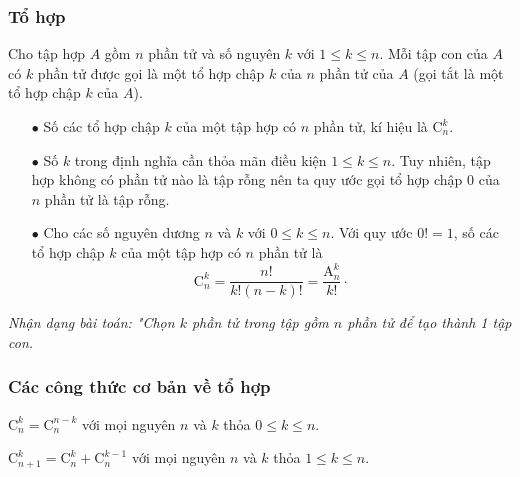 \subsubsection{Tổ hợp}
Cho tập hợp $A$ gồm $n$ phần tử và số nguyên $k$ với $1\le k\le n$. Mỗi tập con của $A$ có $k$ phần tử được gọi là một tổ hợp chập $k$ của $n$ phần tử của $A$ (gọi tắt là một tổ hợp chập $k$ của $A$).
\begin{boxkn}
	\begin{itemize}
		\item [$\bullet$] Số các tổ hợp chập $k$ của một tập hợp có $n$ phần tử, kí hiệu là
		$\mathrm{C}_n^k$. 
		\item [$\bullet$] Số $k$  trong định nghĩa cần thỏa mãn điều kiện $1 \leq k \leq n$. Tuy nhiên, tập hợp không có phần tử nào là tập rỗng nên ta quy ước gọi tổ hợp chập $0$  của $n$  phần tử là tập rỗng.
		\item [$\bullet$] Cho các số nguyên dương $n$ và $k$ với $0\le k\le n$. Với quy ước $0! = 1$, số các tổ hợp chập $k$ của một tập hợp có $n$ phần tử là
		$$\mathrm{C}_n^k=\dfrac{n!}{k!(n-k)!}=\dfrac{\mathrm{A}_n^k}{k!}\cdot$$
	\end{itemize}
\end{boxkn}
\noindent
\textit{Nhận dạng bài toán: "Chọn $k$ phần tử trong tập gồm $n$ phần tử để tạo thành 1 tập con.}
\subsubsection{Các công thức cơ bản về tổ hợp}
\begin{boxkn}
	\begin{listEX}[1]
		\item [\ding{172}] $\mathrm{C}_n^k=\mathrm{C}_n^{n-k}$ với mọi nguyên $n$ và $k$ thỏa $0\le k\le n$.
		\item [\ding{173}] $\mathrm{C}_{n+1}^k=\mathrm{C}_n^k+\mathrm{C}_n^{k-1}$ với mọi nguyên $n$ và $k$ thỏa $1\le k\le n$.
	\end{listEX}
\end{boxkn}